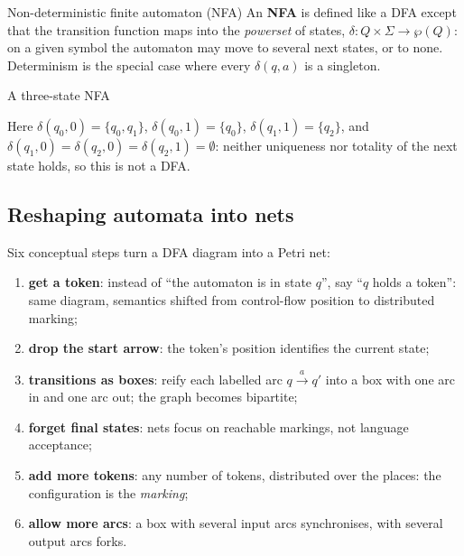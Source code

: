 \begin{definitionbox}{Non-deterministic finite automaton (NFA)}
An \textbf{NFA} is defined like a DFA except that the transition function maps into the \emph{powerset} of states, $\delta : Q \times \Sigma \to \wp(Q)$: on a given symbol the automaton may move to several next states, or to none. Determinism is the special case where every $\delta(q, a)$ is a singleton.
\end{definitionbox}

\begin{examplebox}{A three-state NFA}
\begin{center}
\end{center}
Here $\delta(q_0, 0) = \{q_0, q_1\}$, $\delta(q_0, 1) = \{q_0\}$, $\delta(q_1, 1) = \{q_2\}$, and $\delta(q_1, 0) = \delta(q_2, 0) = \delta(q_2, 1) = \emptyset$: neither uniqueness nor totality of the next state holds, so this is not a DFA.
\end{examplebox}

\subsection{Reshaping automata into nets}

Six conceptual steps turn a DFA diagram into a Petri net:
\begin{enumerate}
  \item \textbf{get a token}: instead of ``the automaton is in state $q$'', say ``$q$ holds a token'': same diagram, semantics shifted from control-flow position to distributed marking;
  \item \textbf{drop the start arrow}: the token's position identifies the current state;
  \item \textbf{transitions as boxes}: reify each labelled arc $q \xrightarrow{a} q'$ into a box with one arc in and one arc out; the graph becomes bipartite;
  \item \textbf{forget final states}: nets focus on reachable markings, not language acceptance;
  \item \textbf{add more tokens}: any number of tokens, distributed over the places: the configuration is the \emph{marking};
  \item \textbf{allow more arcs}: a box with several input arcs synchronises, with several output arcs forks.
\end{enumerate}


